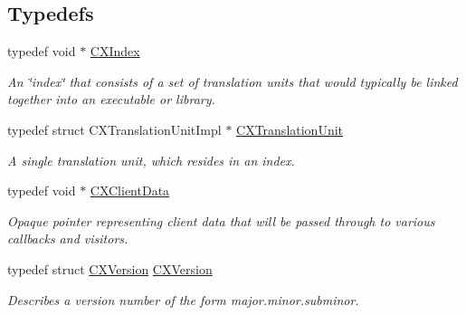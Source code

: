 \subsection*{Typedefs}
\begin{DoxyCompactItemize}
\item 
\mbox{\label{group__CINDEX_gae039c2574bfd75774ca7a9a3e55910cb}} 
typedef void $\ast$ \mbox{\hyperlink{group__CINDEX_gae039c2574bfd75774ca7a9a3e55910cb}{C\+X\+Index}}
\begin{DoxyCompactList}\small\item\em An \char`\"{}index\char`\"{} that consists of a set of translation units that would typically be linked together into an executable or library. \end{DoxyCompactList}\item 
\mbox{\label{group__CINDEX_gacdb7815736ca709ce9a5e1ec2b7e16ac}} 
typedef struct C\+X\+Translation\+Unit\+Impl $\ast$ \mbox{\hyperlink{group__CINDEX_gacdb7815736ca709ce9a5e1ec2b7e16ac}{C\+X\+Translation\+Unit}}
\begin{DoxyCompactList}\small\item\em A single translation unit, which resides in an index. \end{DoxyCompactList}\item 
\mbox{\label{group__CINDEX_gacfa40c3de26d228c0d898403c2c21612}} 
typedef void $\ast$ \mbox{\hyperlink{group__CINDEX_gacfa40c3de26d228c0d898403c2c21612}{C\+X\+Client\+Data}}
\begin{DoxyCompactList}\small\item\em Opaque pointer representing client data that will be passed through to various callbacks and visitors. \end{DoxyCompactList}\item 
\mbox{\label{group__CINDEX_ga7f7575bbf8434fc8ef9e112dc8f156be}} 
typedef struct \mbox{\hyperlink{structCXVersion}{C\+X\+Version}} \mbox{\hyperlink{group__CINDEX_ga7f7575bbf8434fc8ef9e112dc8f156be}{C\+X\+Version}}
\begin{DoxyCompactList}\small\item\em Describes a version number of the form major.\+minor.\+subminor. \end{DoxyCompactList}\end{DoxyCompactItemize}
